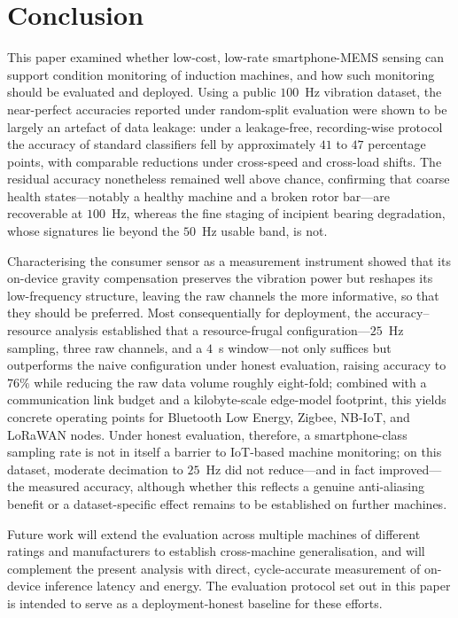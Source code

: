 
\section{Conclusion}
\label{sec:conclusion}

This paper examined whether low-cost, low-rate smartphone-MEMS sensing can support
condition monitoring of induction machines, and how such monitoring should be
evaluated and deployed. Using a public $100$~Hz vibration dataset, the near-perfect
accuracies reported under random-split evaluation were shown to be largely an
artefact of data leakage: under a leakage-free, recording-wise protocol the
accuracy of standard classifiers fell by approximately $41$ to $47$ percentage
points, with comparable reductions under cross-speed and cross-load shifts. The
residual accuracy nonetheless remained well above chance, confirming that coarse
health states---notably a healthy machine and a broken rotor bar---are recoverable
at $100$~Hz, whereas the fine staging of incipient bearing degradation, whose
signatures lie beyond the $50$~Hz usable band, is not.

Characterising the consumer sensor as a measurement instrument showed that its
on-device gravity compensation preserves the vibration power but reshapes its
low-frequency structure, leaving the raw channels the more informative, so that
they should be preferred. Most consequentially for
deployment, the accuracy--resource analysis established that a resource-frugal
configuration---$25$~Hz sampling, three raw channels, and a $4$~s window---not
only suffices but outperforms the naive configuration under honest evaluation,
raising accuracy to $76\%$ while reducing the raw data volume roughly eight-fold;
combined with a communication link budget and a kilobyte-scale edge-model
footprint, this yields concrete operating points for Bluetooth Low Energy,
Zigbee, NB-IoT, and LoRaWAN nodes. Under honest evaluation, therefore, a
smartphone-class sampling rate is not in itself a barrier to IoT-based machine
monitoring; on this dataset, moderate decimation to $25$~Hz did not reduce---and
in fact improved---the measured accuracy, although whether this reflects a
genuine anti-aliasing benefit or a dataset-specific effect remains to be
established on further machines.

Future work will extend the evaluation across multiple machines of different
ratings and manufacturers to establish cross-machine generalisation, and will
complement the present analysis with direct, cycle-accurate measurement of
on-device inference latency and energy. The evaluation protocol set out in this
paper is intended to serve as a deployment-honest baseline for these efforts.
